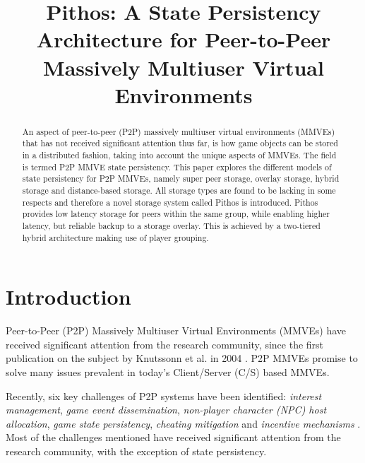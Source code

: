 \documentclass[10pt,a4paper,conference]{IEEEtran}
\begin{document}
%
\title{Pithos: A State Persistency Architecture for Peer-to-Peer Massively Multiuser Virtual Environments}

\author{}

\maketitle

\begin{abstract}
An aspect of peer-to-peer (P2P) massively multiuser virtual environments (MMVEs) that has not received significant attention thus far, is how game
objects can be stored in a distributed fashion, taking into account the unique aspects of MMVEs. The field is termed P2P MMVE state persistency. This
paper explores the different models of state persistency for P2P MMVEs, namely super peer storage, overlay storage, hybrid storage and distance-based
storage. All storage types are found to be lacking in some respects and therefore a novel storage system called Pithos is introduced. Pithos provides
low latency storage for peers within the same group, while enabling higher latency, but reliable backup to a storage overlay. This is achieved by a
two-tiered hybrid architecture making use of player grouping.
\end{abstract}


\section{Introduction}
\label{introduction}

Peer-to-Peer (P2P) Massively Multiuser Virtual Environments (MMVEs) have received significant attention from the research community, since the first
publication on the subject by Knutssonn et al. in 2004 \cite{knutsson_p2p_first}. P2P MMVEs promise to solve many issues prevalent in today's
Client/Server (C/S) based MMVEs.

Recently, six key challenges of P2P systems have been identified: \emph{interest management}, \emph{game event dissemination}, \emph{non-player
character (NPC) host allocation}, \emph{game state persistency}, \emph{cheating mitigation} and \emph{incentive mechanisms}
\cite{Fan_deisgn_issues_p2p}. Most of the challenges mentioned have received significant attention from the research community, with the exception of
state persistency.
\end{document}

